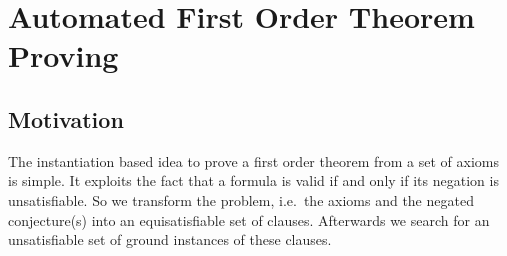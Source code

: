 
\chapter{Automated First Order Theorem Proving}



\section{Motivation}

The instantiation based idea to prove a first order theorem from a set of axioms is simple. 
It exploits the fact that a formula is valid if and only if its negation is unsatisfiable.
So we transform the problem, i.e.~the axioms and the negated conjecture(s) into an equisatisfiable set of clauses.
Afterwards we search for an unsatisfiable set of ground instances of these clauses.



